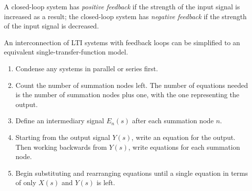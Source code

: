\documentclass{report}
\begin{document}
A closed-loop system has \emph{positive feedback} if the strength of the input signal is increased as a result; the closed-loop system has \emph{negative feedback} if the strength 
of the input signal is decreased. 
\begin{tcolorbox}[width=\textwidth,colback={white}, sharp corners]
    An interconnection of LTI systems with feedback loops can be simplified to an equivalent single-transfer-function model.
    \begin{enumerate}
        \item Condense any systems in parallel or series first.
        \item Count the number of summation nodes left. The number of equations needed is the number of summation nodes plus one, with the one representing the output.
        \item Define an intermediary signal $E_n(s)$ after each summation node $n$.
        \item Starting from the output signal $Y(s)$, write an equation for the output. Then working backwards from $Y(s)$, write equations for each summation node.
        \item Begin substituting and rearranging equations until a single equation in terms of only $X(s)$ and $Y(s)$ is left.
    \end{enumerate}
\end{tcolorbox}
\end{document}
